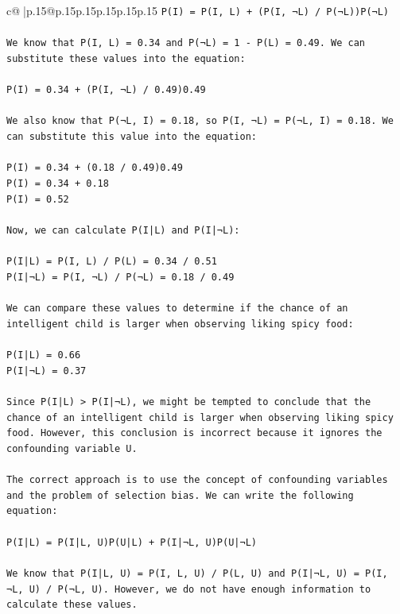 \documentclass{article}
\begin{document}
{\begin{supertabular}{c@{$\;$}|p{.15\linewidth}@{}p{.15\linewidth}p{.15\linewidth}p{.15\linewidth}p{.15\linewidth}p{.15\linewidth}}
{{{\texttt{P(I) = P(I, L) + (P(I, ¬L) / P(¬L))P(¬L)} \\
\\ 
\texttt{We know that P(I, L) = 0.34 and P(¬L) = 1 {-} P(L) = 0.49. We can substitute these values into the equation:} \\
\\ 
\texttt{P(I) = 0.34 + (P(I, ¬L) / 0.49)0.49} \\
\\ 
\texttt{We also know that P(¬L, I) = 0.18, so P(I, ¬L) = P(¬L, I) = 0.18. We can substitute this value into the equation:} \\
\\ 
\texttt{P(I) = 0.34 + (0.18 / 0.49)0.49} \\
\texttt{P(I) = 0.34 + 0.18} \\
\texttt{P(I) = 0.52} \\
\\ 
\texttt{Now, we can calculate P(I|L) and P(I|¬L):} \\
\\ 
\texttt{P(I|L) = P(I, L) / P(L) = 0.34 / 0.51} \\
\texttt{P(I|¬L) = P(I, ¬L) / P(¬L) = 0.18 / 0.49} \\
\\ 
\texttt{We can compare these values to determine if the chance of an intelligent child is larger when observing liking spicy food:} \\
\\ 
\texttt{P(I|L) = 0.66} \\
\texttt{P(I|¬L) = 0.37} \\
\\ 
\texttt{Since P(I|L) > P(I|¬L), we might be tempted to conclude that the chance of an intelligent child is larger when observing liking spicy food. However, this conclusion is incorrect because it ignores the confounding variable U.} \\
\\ 
\texttt{The correct approach is to use the concept of confounding variables and the problem of selection bias. We can write the following equation:} \\
\\ 
\texttt{P(I|L) = P(I|L, U)P(U|L) + P(I|¬L, U)P(U|¬L)} \\
\\ 
\texttt{We know that P(I|L, U) = P(I, L, U) / P(L, U) and P(I|¬L, U) = P(I, ¬L, U) / P(¬L, U). However, we do not have enough information to calculate these values.} \\
}}}
\end{supertabular}}
\end{document}

